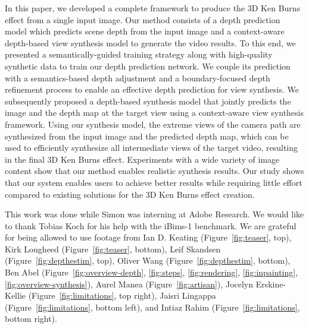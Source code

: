 \documentclass[acmtog,authorversion]{acmart}
\begin{document}
In this paper, we developed a complete framework to produce the 3D Ken Burns effect from a single input image. Our method consists of a depth prediction model which predicts scene depth from the input image and a context-aware depth-based view synthesis model to generate the video results. To this end, we presented a semantically-guided training strategy along with high-quality synthetic data to train our depth prediction network. We couple its prediction with a semantics-based depth adjustment and a boundary-focused depth refinement process to enable an effective depth prediction for view synthesis. We subsequently proposed a depth-based synthesis model that jointly predicts the image and the depth map at the target view using a context-aware view synthesis framework. Using our synthesis model, the extreme views of the camera path are synthesized from the input image and the predicted depth map, which can be used to efficiently synthesize all intermediate views of the target video, resulting in the final 3D Ken Burns effect. Experiments with a wide variety of image content show that our method enables realistic synthesis results. Our study shows that our system enables users to achieve better results while requiring little effort compared to existing solutions for the 3D Ken Burns effect creation.

\begin{acks}
    This work was done while Simon was interning at Adobe Research. We would like to thank Tobias Koch for his help with the iBims-1 benchmark. We are grateful for being allowed to use footage from Ian D. Keating (Figure~\ref{fig:teaser}, top), Kirk Lougheed (Figure~\ref{fig:teaser}, bottom), Leif Skandsen (Figure~\ref{fig:depthestim}, top), Oliver Wang (Figure~\ref{fig:depthestim}, bottom), Ben Abel (Figure~\ref{fig:overview-depth}, \ref{fig:steps}, \ref{fig:rendering}, \ref{fig:inpainting}, \ref{fig:overview-synthesis}), Aurel Manea (Figure~\ref{fig:artisan}), Jocelyn Erskine-Kellie (Figure~\ref{fig:limitations}, top right), Jaisri Lingappa (Figure~\ref{fig:limitations}, bottom left), and Intiaz Rahim (Figure~\ref{fig:limitations}, bottom right).
\end{acks}

{\small


}
\end{document}
